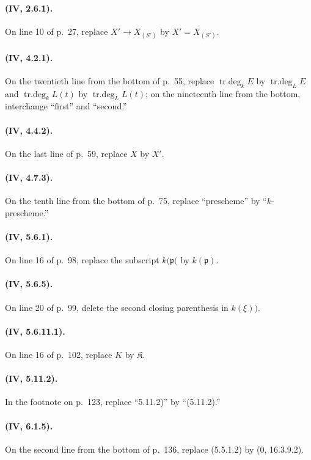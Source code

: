 \paragraph{(IV, 2.6.1).}
On line 10 of p.~27, replace $X'\to X_{(S')}$ by $X'=X_{(S')}$.

\paragraph{(IV, 4.2.1).}
On the twentieth line from the bottom of p.~55, replace
$\operatorname{tr.deg}_kE$ by $\operatorname{tr.deg}_LE$ and
$\operatorname{tr.deg}_kL(t)$ by $\operatorname{tr.deg}_LL(t)$; on the
nineteenth line from the bottom, interchange ``first'' and ``second.''

\paragraph{(IV, 4.4.2).}
On the last line of p.~59, replace $X$ by $X'$.

\paragraph{(IV, 4.7.3).}
On the tenth line from the bottom of p.~75, replace ``prescheme'' by
``$k$-prescheme.''

\paragraph{(IV, 5.6.1).}
On line 16 of p.~98, replace the subscript $k(\mathfrak p($ by
$k(\mathfrak p)$.

\paragraph{(IV, 5.6.5).}
On line 20 of p.~99, delete the second closing parenthesis in $k(\xi))$.

\paragraph{(IV, 5.6.11.1).}
On line 16 of p.~102, replace $K$ by $\mathfrak K$.

\paragraph{(IV, 5.11.2).}
In the footnote on p.~123, replace ``5.11.2)'' by ``(5.11.2).''

\paragraph{(IV, 6.1.5).}
On the second line from the bottom of p.~136, replace (5.5.1.2) by
($0$, 16.3.9.2).

